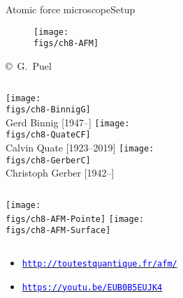 \documentclass{beamer}
\begin{document}
\begin{frame}{Atomic force microscope}{Setup}

\begin{overprint}

\vskip-20pt
\begin{figure}
\centering\texttt{[image: \\figs/ch8-AFM]}
\end{figure}
\vskip-20pt{\hspace*{8.5truecm}\mbox{\tiny{\copyright\ G. Puel}}}

\vskip10pt
\begin{columns}[t]
\centering\texttt{[image: \\figs/ch8-BinnigG]}\\
{\scriptsize Gerd Binnig [1947--]}
\centering\texttt{[image: \\figs/ch8-QuateCF]}\\
{\scriptsize Calvin Quate [1923--2019]}
\centering\texttt{[image: \\figs/ch8-GerberC]}\\
{\scriptsize Christoph Gerber [1942--]}
\end{columns}


\begin{columns}[t]
\centering\texttt{[image: \\figs/ch8-AFM-Pointe]}
\vskip-110pt
\centering\texttt{[image: \\figs/ch8-AFM-Surface]}
\end{columns}
\vskip20pt
\begin{itemize}
\item \href{http://toutestquantique.fr/afm/}{\textcolor{blue}{\texttt{http://toutestquantique.fr/afm/}}}
\item \href{https://youtu.be/EUB0B5EUJK4}{\textcolor{blue}{\texttt{https://youtu.be/EUB0B5EUJK4}}}
\end{itemize}

\end{overprint}

\end{frame}
\end{document}
